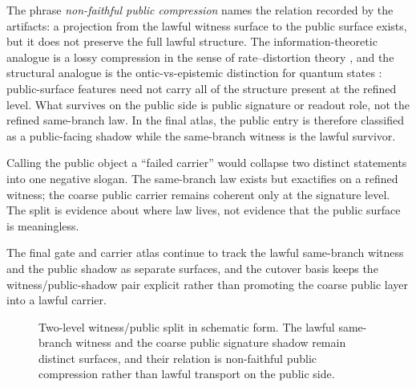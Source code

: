 \documentclass[11pt]{article}
\theoremstyle{definition}
\begin{document}
The phrase \emph{non-faithful public compression} names the relation recorded by the
artifacts: a projection from the lawful witness surface to the public surface exists,
but it does not preserve the full lawful structure. The information-theoretic analogue
is a lossy compression in the sense of rate--distortion theory \citep{CoverThomas2006},
and the structural analogue is the ontic-vs-epistemic distinction for quantum states
\citep{HarriganSpekkens2010}: public-surface features need not carry all of the
structure present at the refined level. What survives on the public side is public
signature or readout role, not the refined same-branch law. In the final atlas, the
public entry is therefore classified as a public-facing shadow while the same-branch
witness is the lawful survivor.

Calling the public object a ``failed carrier'' would collapse two distinct statements
into one negative slogan. The same-branch law exists but exactifies on a refined
witness; the coarse public carrier remains coherent only at the signature level. The
split is evidence about where law lives, not evidence that the public surface is
meaningless.

The final gate and carrier atlas continue to track the lawful same-branch witness and
the public shadow as separate surfaces, and the cutover basis keeps the
witness/public-shadow pair explicit rather than promoting the coarse public layer into
a lawful carrier.

\begin{figure}[t]
\centering
{}
 \caption{Two-level witness/public split in schematic form. The lawful same-branch witness
and the coarse public signature shadow remain distinct surfaces, and their relation is
non-faithful public compression rather than lawful transport on the public side.}
\label{fig:witness-public-shadow}
\end{figure}
\end{document}
